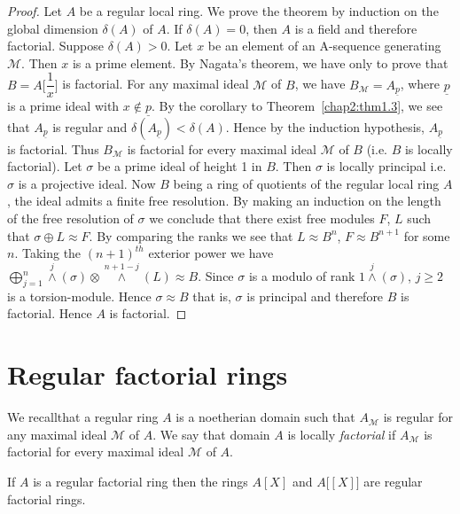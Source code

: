 \begin{proof}
Let $A$ be a regular local ring. We prove the theorem by induction on
the global dimension $\delta (A) $ of $A$. If $\delta (A) = 0$, then
$A$ is a field and therefore factorial. Suppose $\delta (A) > 0$. Let
$x$ be an element of an A-sequence generating $\mathscr{M}$. Then $x$
is a prime element. By Nagata's theorem, we have only to prove that
$B= A \big[\dfrac{1}{x} \big]$ is factorial. For any maximal ideal
$\mathscr{M}$ of $B$, we have $B_{\mathscr{M}} = A_{\underline{p}}$,
where $\underline{p}$ is a prime ideal with $x \notin
\underline{p}$. By the corollary to Theorem~\ref{chap2:thm1.3}, we see that
$A_{\underline{p}}$ is regular and $\delta (A_{\underline{p}}) <
\delta (A)$. Hence by the induction hypothesis, $A_{\underline{p}}$ is
factorial. Thus $B_{\mathscr{M}}$ is factorial for every maximal ideal
$\mathscr{M}$ of $B$ (i.e. $B$ is locally factorial). Let $\sigma$ be
a prime ideal of height 1 in $B$. Then $\sigma$ is locally principal
i.e. $\sigma$ is a projective ideal. Now $B$ being a ring of quotients
of the regular local ring $A$, the ideal admits a finite free
resolution. By making an induction on the length of the free
resolution of $\sigma$ we conclude that there exist free modules $F$, $L$
such that $\sigma \oplus L \approx F$. By comparing the ranks we see
that $L \approx B^n$, $F \approx B^{n+1}$ for some $n$. Taking the
$(n+1)^{th}$ exterior power we have $\bigoplus\limits^n_{j=1}
  \overset{j}{\wedge} (\sigma) \otimes \overset{n+1-j}{\wedge}
(L) \approx B$. Since $\sigma$ is a modulo of rank $1 \overset{j}{\wedge}
(\sigma)$, $j \ge 2$ is a torsion-module. Hence $\sigma \approx B$ that
is, $\sigma$ is principal and therefore $B$ is factorial. Hence $A$ is
factorial. 
\end{proof}    
    

\section{Regular factorial rings}\label{chap2:sec2}%
We recall\pageoriginale that a regular ring $A$ is a noetherian domain
such that 
$A_{\mathscr{M}}$ is regular for any maximal ideal $\mathscr{M}$ of
$A$. We say that domain $A$ is locally \textit{factorial} if
$A_{\mathscr{M}}$ is factorial for every maximal ideal $\mathscr{M}$ of
$A$. 


\setcounter{theorem}{0}
\begin{theorem}
If $A$ is a regular factorial ring then the rings $A[X]$ and
  $A \big[[X]\big]$  are regular factorial rings. 
\end{theorem} 
   
